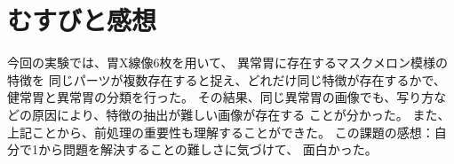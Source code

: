 \section{むすびと感想}
今回の実験では、胃X線像6枚を用いて、
異常胃に存在するマスクメロン模様の特徴を
同じパーツが複数存在すると捉え、どれだけ同じ特徴が存在するかで、健常胃と異常胃の分類を行った。
その結果、同じ異常胃の画像でも、写り方などの原因により、特徴の抽出が難しい画像が存在する
ことが分かった。
また、上記ことから、前処理の重要性も理解することができた。
この課題の感想：自分で1から問題を解決することの難しさに気づけて、
面白かった。